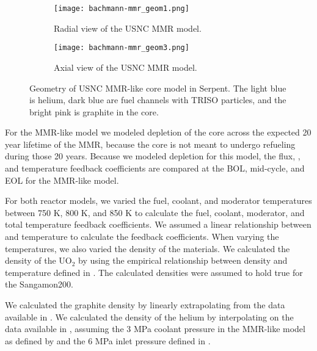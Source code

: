 \begin{figure}
        \begin{subfigure}{0.48\textwidth}
                \centering
                \texttt{[image: bachmann-mmr\_geom1.png]}
                \caption{Radial view of the USNC MMR model.}
                \label{fig:mmr_radial}
        \end{subfigure}
        \hfill 
        \begin{subfigure}{0.48\textwidth}
                \centering
                \texttt{[image: bachmann-mmr\_geom3.png]}
                \caption{Axial view of the USNC MMR model.}
                \label{fig:mmr_axial}
        \end{subfigure}
        \caption{Geometry of USNC MMR-like core model in Serpent. The 
        light blue is helium, dark blue are fuel channels with TRISO particles, 
        and the bright pink is graphite in the core.}
        \label{fig:mmr_core}
\end{figure}

For the \gls{MMR}-like model we modeled depletion of the core across the 
expected 20 year lifetime of the \gls{MMR}, because the core is not 
meant to undergo refueling during those 20 years. Because we modeled 
depletion for this model, the flux, \keff, and temperature feedback coefficients
are compared at the \gls{BOL}, mid-cycle, and \gls{EOL} for the \gls{MMR}-like 
model. 

For both reactor models, we varied the fuel, coolant, and moderator temperatures 
between 750 K, 800 K, and 850 K to calculate the fuel, coolant, moderator, and 
total temperature feedback coefficients. We assumed a linear relationship between 
\keff and temperature to calculate the feedback coefficients. When varying the 
temperatures, we also varied the density of the materials. We calculated the 
density of the UO$_2$ by using the empirical relationship between density and 
temperature defined in \cite{fink_thermophysical_2000}. The calculated 
densities were assumed to hold true for the Sangamon200. 

We calculated the 
graphite density by linearly extrapolating from the data available in 
\cite{mceligot_thermal_nodate}. We calculated the density of the helium 
by interpolating on the data available in \cite{petersen_properties_nodate}, 
assuming the 3 MPa coolant pressure in the \gls{MMR}-like model as defined 
by \cite{noauthor_usnc_2021} and the 6 MPa inlet pressure defined in 
\cite{mulder_overview_2021}. 


